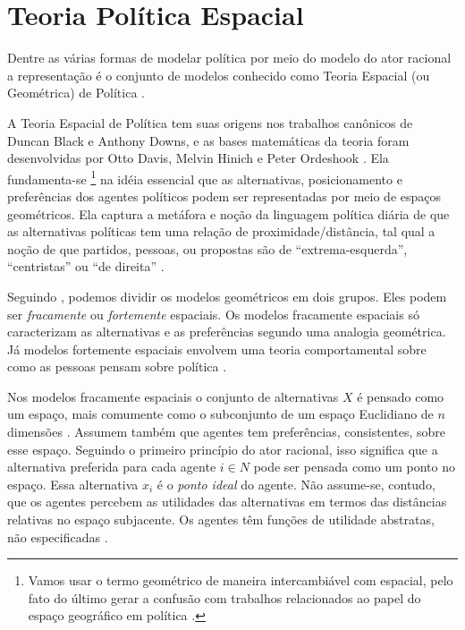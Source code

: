 \section{Teoria Política Espacial}

Dentre as várias formas de modelar política por meio do modelo do ator racional
a representação é o conjunto de modelos conhecido como Teoria Espacial (ou
Geométrica) de Política \cite{van2005political}.

A Teoria Espacial de Política tem suas origens nos trabalhos canônicos de Duncan
Black e Anthony Downs, e as bases matemáticas da teoria foram desenvolvidas por
Otto Davis, Melvin Hinich e Peter Ordeshook \cite{black1958theory,
  downs1957economic, poole2005spatial, miller2015spatial}. Ela fundamenta-se
\footnote{Vamos usar o termo geométrico de maneira intercambiável com espacial,
  pelo fato do último gerar a confusão com trabalhos relacionados ao papel do
  espaço geográfico em política \cite{ward2002spatial, poole2005spatial}.} na
idéia essencial que as alternativas, posicionamento e preferências dos agentes
políticos podem ser representadas por meio de espaços geométricos. Ela captura a
metáfora e noção da linguagem política diária de que as alternativas políticas
tem uma relação de proximidade/distância, tal qual a noção de que partidos,
pessoas, ou propostas são de ``extrema-esquerda'', ``centristas'' ou ``de
direita'' \cite{munger2015choosing}.


Seguindo , podemos dividir os modelos
geométricos em dois grupos. Eles podem ser \textit{fracamente} ou
\textit{fortemente} espaciais. Os modelos fracamente espaciais só caracterizam
as alternativas e as preferências segundo uma analogia geométrica. Já modelos
fortemente espaciais envolvem uma teoria comportamental sobre como as pessoas
pensam sobre política \cite{laver2014measuring}.


Nos modelos fracamente espaciais o conjunto de alternativas \(X\) é pensado como
um espaço, mais comumente como o subconjunto de um espaço Euclidiano de \(n\)
dimensões \cite{austen1998social}. Assumem também que agentes tem preferências,
consistentes, sobre esse espaço. Seguindo o primeiro princípio do ator racional,
isso significa que a alternativa preferida para cada agente \(i \in N\) pode ser
pensada como um ponto no espaço. Essa alternativa $x_i$ é o \textit{ponto ideal}
do agente. Não assume-se, contudo, que os agentes percebem as utilidades das
alternativas em termos das distâncias relativas no espaço subjacente. Os agentes
têm funções de utilidade abstratas, não especificadas
\cite[p.14]{humphreys2010spatial}.

